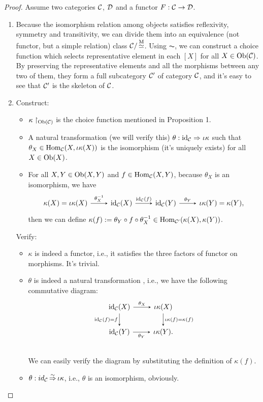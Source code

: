 \documentclass{article}
\begin{document}
\begin{proof}
	Assume two categories $\mathcal{C}$, $\mathcal{D}$ and a functor $F:\mathcal{C}\to\mathcal{D}$.
	\begin{enumerate}
		\item Because the isomorphism relation among objects satisfies ref{}lexivity, symmetry and transitivity, we can divide them into an equivalence (not functor, but a simple relation) class $\mathcal{C}/\mathop{\simeq}\limits^\mathrm{M}$. Using $\AC$, we can construct a choice function which selects representative element in each $[X]$ for all $X\in\mathrm{Ob}(\mathcal{C})$. By preserving the representative elements and all the morphisms between any two of them, they form a full subcategory $\mathcal{C}'$ of category $\mathcal{C}$, and it's easy to see that $\mathcal{C}'$ is the skeleton of $\mathcal{C}$.
		
		\item Construct:\begin{itemize}
			\item $\kappa\upharpoonright_{\mathrm{Ob}(\mathcal{C})}$ is the choice function mentioned in Proposition 1.
			\item A natural transformation (we will verify this) $\theta:\mathrm{id}_{\mathcal{C}}\Rightarrow\iota\kappa$ such that $\theta_X\in\mathrm{Hom}_{\mathcal{C}}(X,\iota\kappa(X))$ is the isomorphism (it's uniquely exists) for all $X\in\mathrm{Ob}(X)$.
			\item For all $X,Y\in\mathrm{Ob}(X,Y)$ and $f\in\mathrm{Hom}_{\mathcal{C}}(X,Y)$, because $\theta_X$ is an isomorphism, we have
				\[\begin{tikzcd}
					\kappa(X)=\iota\kappa(X) \arrow[->,>=stealth, r, "\theta\iv_X"] &
					\id_\ca(X) \arrow[->,>=stealth, r, "\id_\ca(f)"] &
					\id_\ca(Y) \arrow[->,>=stealth, r, "\theta_Y"] &
					\iota\kappa(Y)=\kappa(Y),
				\end{tikzcd}\]
				then we can define $\kappa(f):=\theta_Y\circ f\circ\theta^{-1}_X\in\mathrm{Hom}_{\mathcal{C}'}(\kappa(X),\kappa(Y))$.
			\end{itemize}
		
			Verify:\begin{itemize}
				\item $\kappa$ is indeed a functor, i.e., it satisfies the three factors of functor on morphisms. It's trivial.
				\item $\theta$ is indeed a natural transformation , i.e., we have the following commutative diagram:
				\[\begin{tikzcd}
					\id_\ca(X) \arrow[->,>=stealth,r,"\theta_X"] \arrow[->,>=stealth,d,"\id_\ca(f)=f"'] &
					\iota\kappa(X) \arrow[->,>=stealth,d,"\iota\kappa(f)=\kappa(f)"]\\
					\id_\ca(Y) \arrow[->,>=stealth,r,"\theta_Y"'] & \iota\kappa(Y).\\
				\end{tikzcd}\]
				We can easily verify the diagram by substituting the definition of $\kappa(f)$.
				\item $\theta:id_{\mathcal{C}}\mathop{\Rightarrow}\limits^{\sim}\iota\kappa$, i.e., $\theta$ is an isomorphism, obviously.
			\end{itemize}
			

\end{enumerate}
\end{proof}
\end{document}
